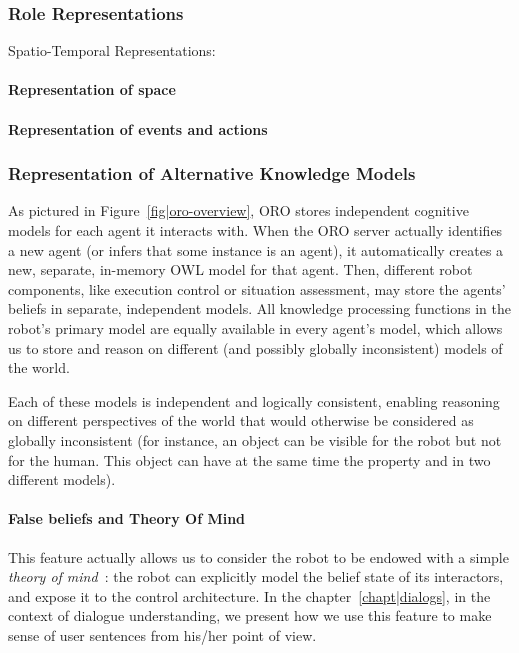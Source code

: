 \subsubsection{Role Representations}
Spatio-Temporal Representations:

\paragraph{Representation of space}
\paragraph{Representation of events and actions}


\subsubsection{Representation of Alternative Knowledge Models}
\label{sect|alterite}

As pictured in Figure~\ref{fig|oro-overview}, ORO stores independent cognitive
models for each agent it interacts with. When the ORO server actually
identifies a new agent (or infers that some instance is an agent), it
automatically creates a new, separate, in-memory OWL model for that agent.
Then, different robot components, like execution control or situation
assessment, may store the agents' beliefs in separate, independent models. All
knowledge processing functions in the robot's primary model are equally
available in every agent's model, which allows us to store and reason on
different (and possibly globally inconsistent) models of the world.

Each of these models is independent and logically consistent, enabling
reasoning on different perspectives of the world that would otherwise be
considered as globally inconsistent (for instance, an object can be visible for
the robot but not for the human. This object can have at the same time the
property  and  in two different models).

\paragraph{False beliefs and Theory Of Mind} \label{sect|theory-of-mind}

This feature actually allows us to consider the robot to be endowed with a
simple \emph{theory of mind}~\cite{Scassellati2002}: the robot can explicitly
model the belief state of its interactors, and expose it to the control
architecture. In the chapter~\ref{chapt|dialogs},  in the context of dialogue
understanding, we present how we use this feature to make sense of user
sentences from his/her point of view.

